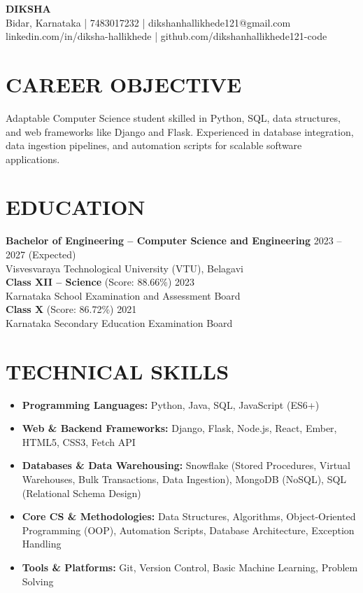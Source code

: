 \documentclass[10pt,letterpaper]{article}
\begin{document}
\begin{center}
    {\Huge \textbf{DIKSHA}}\\[0.5em]
    Bidar, Karnataka | 7483017232 | dikshanhallikhede121@gmail.com\\
    linkedin.com/in/diksha-hallikhede | github.com/dikshanhallikhede121-code
\end{center}

\section*{CAREER OBJECTIVE}
Adaptable Computer Science student skilled in Python, SQL, data structures, and web frameworks like Django and Flask. Experienced in database integration, data ingestion pipelines, and automation scripts for scalable software applications.

\section*{EDUCATION}
\noindent\textbf{Bachelor of Engineering – Computer Science and Engineering} \hfill 2023 -- 2027 (Expected)\\
Visvesvaraya Technological University (VTU), Belagavi\\[0.4em]
\noindent\textbf{Class XII – Science} (Score: 88.66\%) \hfill 2023\\
Karnataka School Examination and Assessment Board\\[0.4em]
\noindent\textbf{Class X} (Score: 86.72\%) \hfill 2021\\
Karnataka Secondary Education Examination Board

\section*{TECHNICAL SKILLS}
\begin{itemize}
    \item \textbf{Programming Languages:} Python, Java, SQL, JavaScript (ES6+)
    \item \textbf{Web \& Backend Frameworks:} Django, Flask, Node.js, React, Ember, HTML5, CSS3, Fetch API
    \item \textbf{Databases \& Data Warehousing:} Snowflake (Stored Procedures, Virtual Warehouses, Bulk Transactions, Data Ingestion), MongoDB (NoSQL), SQL (Relational Schema Design)
    \item \textbf{Core CS \& Methodologies:} Data Structures, Algorithms, Object-Oriented Programming (OOP), Automation Scripts, Database Architecture, Exception Handling
    \item \textbf{Tools \& Platforms:} Git, Version Control, Basic Machine Learning, Problem Solving
\end{itemize}
\end{document}
